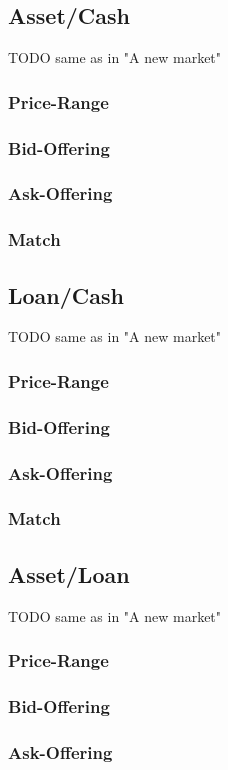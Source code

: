 \documentclass[Bachelorarbeit.tex]{subfiles}
\begin{document}
\subsection{Asset/Cash}
TODO same as in "A new market"
\subsubsection{Price-Range}
\subsubsection{Bid-Offering}
\subsubsection{Ask-Offering}
\subsubsection{Match}

\subsection{Loan/Cash}
TODO same as in "A new market"
\subsubsection{Price-Range}
\subsubsection{Bid-Offering}
\subsubsection{Ask-Offering}
\subsubsection{Match}

\subsection{Asset/Loan}
TODO same as in "A new market"
\subsubsection{Price-Range}
\subsubsection{Bid-Offering}
\subsubsection{Ask-Offering}
\end{document}
